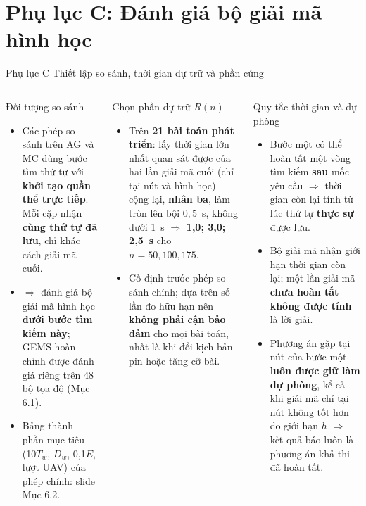 \documentclass[aspectratio=169,10pt,t,xcolor={table}]{beamer}
\newcommand{\apptitle}[2]{Phụ lục #1 \textperiodcentered{} #2}
\begin{document}
\section{Phụ lục C: Đánh giá bộ giải mã hình học}

\begin{frame}[label=appC]{\apptitle{C}{Thiết lập so sánh, thời gian dự trữ và phần cứng}}
\begin{columns}[T,onlytextwidth]
\begin{block}{Đối tượng so sánh}
\scriptsize
\begin{itemize}
\item Các phép so sánh trên AG và MC dùng bước tìm thứ tự với \textbf{khởi tạo quần thể trực tiếp}. Mỗi cặp nhận \textbf{cùng thứ tự đã lưu}, chỉ khác cách giải mã cuối.
\item $\Rightarrow$ đánh giá bộ giải mã hình học \textbf{dưới bước tìm kiếm này}; GEMS hoàn chỉnh được đánh giá riêng trên 48 bộ tọa độ (Mục 6.1).
\item Bảng thành phần mục tiêu (10$T_w$, $D_w$, 0,1$E$, lượt UAV) của phép chính: slide Mục 6.2.
\end{itemize}
\end{block}
\begin{block}{Chọn phần dự trữ $R(n)$}
\scriptsize
\begin{itemize}
\item Trên \textbf{21 bài toán phát triển}: lấy thời gian lớn nhất quan sát được của hai lần giải mã cuối (chỉ tại nút và hình học) cộng lại, \textbf{nhân ba}, làm tròn lên bội $0{,}5$~s, không dưới 1~s $\Rightarrow$ \textbf{1,0; 3,0; 2,5~s} cho $n=50,100,175$.
\item Cố định trước phép so sánh chính; dựa trên số lần đo hữu hạn nên \textbf{không phải cận bảo đảm} cho mọi bài toán, nhất là khi đổi kịch bản pin hoặc tăng cỡ bài.
\end{itemize}
\end{block}
\begin{block}{Quy tắc thời gian và dự phòng}
\scriptsize
\begin{itemize}
\item Bước một có thể hoàn tất một vòng tìm kiếm \textbf{sau} mốc yêu cầu $\Rightarrow$ thời gian còn lại tính từ lúc thứ tự \textbf{thực sự} được lưu.
\item Bộ giải mã nhận giới hạn thời gian còn lại; một lần giải mã \textbf{chưa hoàn tất không được tính} là lời giải.
\item Phương án gặp tại nút của bước một \textbf{luôn được giữ làm dự phòng}, kể cả khi giải mã chỉ tại nút không tốt hơn do giới hạn $h$ $\Rightarrow$ kết quả báo luôn là phương án khả thi đã hoàn tất.

\end{itemize}
\end{block}
\end{columns}
\end{frame}
\end{document}
